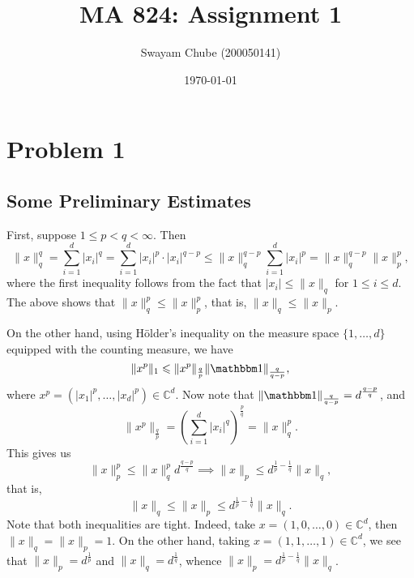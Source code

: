 \documentclass[10pt]{amsart}
\title{MA 824: Assignment 1}
\author{Swayam Chube (200050141)}
\date{\today}
\theoremstyle{thmstyle}
\theoremstyle{defstyle}
\newcommand{\bbC}{\mathbb{C}}
\renewcommand{\le}{\leqslant}
\begin{document}
\maketitle 

\section{Problem 1}

\subsection*{Some Preliminary Estimates}
First, suppose $1\le p <  q < \infty$. Then 
\begin{equation*}
	\|x\|_q^q = \sum_{i = 1}^d |x_i|^q = \sum_{i = 1}^d |x_i|^p\cdot|x_i|^{q - p}\le \|x\|_q^{q - p}\sum_{i = 1}^d |x_i|^p = \|x\|_q^{q - p}\|x\|_p^p,
\end{equation*}
where the first inequality follows from the fact that $|x_i|\le \|x\|_q$ for $1\le i\le d$. The above shows that $\|x\|_q^p\le\|x\|_p^p$, that is, $\|x\|_q\le \|x\|_p$.

On the other hand, using H\"older's inequality on the measure space $\{1,\dots,d\}$ equipped with the counting measure, we have 
\begin{equation*}
	\|x^p\|_1\le \|x^p\|_{\frac{q}{p}}\|\mathbbm 1\|_{\frac{q}{q - p}},
\end{equation*}
where $x^p = (|x_1|^p,\dots,|x_d|^p)\in\bbC^d$. Now note that $\|\mathbbm 1\|_{\frac{q}{q - p}} = d^{\frac{q - p}{q}}$, and 
\begin{equation*}
	\|x^p\|_{\frac{q}{p}} = \left(\sum_{i = 1}^d |x_i|^q\right)^{\frac{p}{q}} = \|x\|_q^p.
\end{equation*}
This gives us 
\begin{equation*}
	\|x\|_p^p\le \|x\|_q^p d^{\frac{q - p}{q}}\implies\|x\|_p\le d^{\frac{1}{p} - \frac{1}{q}}\|x\|_q,
\end{equation*}
that is, 
\begin{equation*}
	\|x\|_q\le \|x\|_p\le d^{\frac{1}{p} - \frac{1}{q}}\|x\|_q.
\end{equation*}
Note that both inequalities are tight. Indeed, take $x = (1,0,\dots,0)\in\bbC^d$, then $\|x\|_q = \|x\|_p = 1$. On the other hand, taking $x = (1, 1,\dots, 1)\in\bbC^d$, we see that $\|x\|_p = d^{\frac{1}{p}}$ and $\|x\|_q = d^{\frac{1}{q}}$, whence $\|x\|_p = d^{\frac{1}{p} - \frac{1}{q}}\|x\|_q$.
\end{document}
